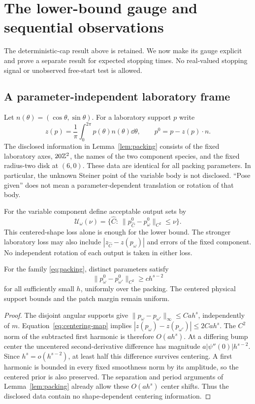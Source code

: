 \section{The lower-bound gauge and sequential observations}
\label{sec:sequential}
The deterministic-cap result above is retained. We now make its gauge
explicit and prove a separate result for expected stopping times. No
real-valued stopping signal or unobserved free-start test is allowed.

\subsection{A parameter-independent laboratory frame}
Let $n(\theta)=(\cos\theta,\sin\theta)$. For a laboratory support $p$
write
\begin{equation}\label{eq:centering-map}
 z(p)=\frac1\pi\int_0^{2\pi}p(\theta)n(\theta)\dd\theta,
 \qquad p^0=p-z(p)\cdot n.
\end{equation}
The disclosed information in Lemma~\ref{lem:packing} consists of the
fixed laboratory axes, $20\mathbb Z^2$, the names of the two component species,
and the fixed radius-two disk at $(6,0)$. These data are identical for
all packing parameters. In particular, the unknown Steiner point of
the variable body is not disclosed. ``Pose given'' does not mean a
parameter-dependent translation or rotation of that body.

For the variable component define acceptable output sets by
\begin{equation}\label{eq:accuracy-sets}
 \mathcal U_\omega(\nu)=
 \{\widehat C:\ \|p^0_{\widehat C}-p^0_\omega\|_{C^2}\le\nu\}.
\end{equation}
This centered-shape loss alone is enough for the lower bound. The
stronger laboratory loss may also include
$|z_{\widehat C}-z(p_\omega)|$ and errors of the fixed component.
No independent rotation of each output is taken in either loss.

\begin{lemma}\label{lem:centered-packing}
For the family \eqref{eq:packing}, distinct parameters satisfy
\[
 \|p^0_\omega-p^0_{\omega'}\|_{C^2}\ge c h^{s-2}
\]
for all sufficiently small $h$, uniformly over the packing. The
centered physical support bounds and the patch margin remain uniform.
\end{lemma}
\begin{proof}
The disjoint angular supports give
$\|p_\omega-p_{\omega'}\|_\infty\le C a h^s$, independently of
$m$. Equation~\eqref{eq:centering-map} implies
$|z(p_\omega)-z(p_{\omega'})|\le2Ca h^s$. The $C^2$ norm of the
subtracted first harmonic is therefore $O(a h^s)$. At a differing
bump center the uncentered second-derivative difference has magnitude
$a|\psi''(0)|h^{s-2}$. Since $h^s=o(h^{s-2})$, at least half this
difference survives centering. A first harmonic is bounded in every
fixed smoothness norm by its amplitude, so the centered prior is also
preserved. The separation and period arguments of
Lemma~\ref{lem:packing} already allow these $O(a h^s)$ center shifts.
Thus the disclosed data contain no shape-dependent centering information.
\end{proof}

